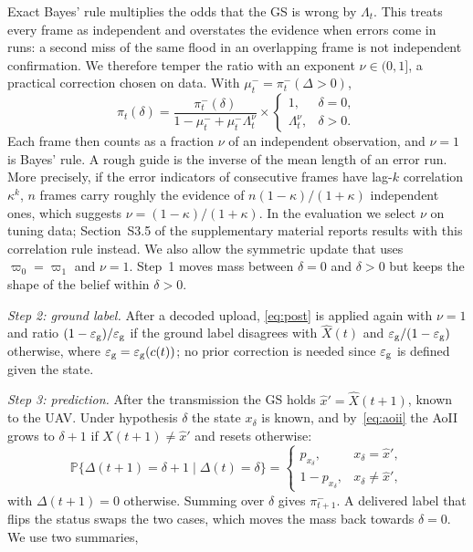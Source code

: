 \documentclass[10pt,journal,compsoc]{IEEEtran}
\theoremstyle{remark}
\newcommand{\Prob}{\mathbb{P}}
\newcommand{\ee}{\varepsilon}
\newcommand{\xh}{\hat{x}}
\begin{document}
Exact Bayes' rule multiplies the odds that the GS is wrong by $\Lambda_t$. This treats every frame as independent and overstates the evidence when errors come in runs: a second miss of the same flood in an overlapping frame is not independent confirmation. We therefore temper the ratio with an exponent $\nu\in(0,1]$, a practical correction chosen on data. With $\mu^-_t=\pi^-_t(\Delta>0)$,
\begin{equation}\label{eq:post}
\pi_t(\delta)=\frac{\pi^-_t(\delta)}{1-\mu^-_t+\mu^-_t\Lambda_t^{\nu}}\times\begin{cases}1, & \delta=0,\\ \Lambda_t^{\nu}, & \delta>0.\end{cases}
\end{equation}
Each frame then counts as a fraction $\nu$ of an independent observation, and $\nu=1$ is Bayes' rule. A rough guide is the inverse of the mean length of an error run. More precisely, if the error indicators of consecutive frames have lag-$k$ correlation $\kappa^k$, $n$ frames carry roughly the evidence of $n(1-\kappa)/(1+\kappa)$ independent ones, which suggests $\nu=(1-\kappa)/(1+\kappa)$. In the evaluation we select $\nu$ on tuning data; Section~S3.5 of the supplementary material reports results with this correlation rule instead. We also allow the symmetric update that uses $\varpi_0=\varpi_1$ and $\nu=1$. Step~1 moves mass between $\delta=0$ and $\delta>0$ but keeps the shape of the belief within $\delta>0$.


\emph{Step 2: ground label.} After a decoded upload, \eqref{eq:post} is applied again with $\nu=1$ and ratio $(1-\ee_{\rm g})/\ee_{\rm g}$ if the ground label disagrees with $\hat X(t)$ and $\ee_{\rm g}/(1-\ee_{\rm g})$ otherwise, where $\ee_{\rm g}=\ee_{\rm g}(c(t))$; no prior correction is needed since $\ee_{\rm g}$ is defined given the state.

\emph{Step 3: prediction.} After the transmission the GS holds $\xh'=\hat X(t+1)$, known to the UAV. Under hypothesis $\delta$ the state $x_\delta$ is known, and by~\eqref{eq:aoii} the AoII grows to $\delta+1$ if $X(t+1)\neq\xh'$ and resets otherwise:
\begin{equation}\label{eq:pred}
\Prob\big\{\Delta(t+1)=\delta+1\mid\Delta(t)=\delta\big\}=\begin{cases}p_{x_\delta}, & x_\delta=\xh',\\ 1-p_{x_\delta}, & x_\delta\neq\xh',\end{cases}
\end{equation}
with $\Delta(t+1)=0$ otherwise. Summing over $\delta$ gives $\pi^-_{t+1}$. A delivered label that flips the status swaps the two cases, which moves the mass back towards $\delta=0$. We use two summaries,
\end{document}
